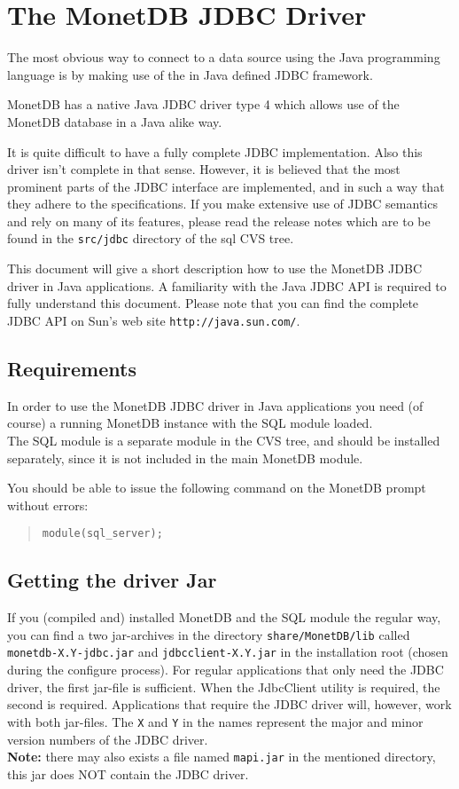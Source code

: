 \documentclass{article}
\begin{document}
\section{The MonetDB JDBC Driver}
The most obvious way to connect to a data source using the Java
programming language is by making use of the in Java defined JDBC
framework.

MonetDB has a native Java JDBC driver type 4 which allows use of the
MonetDB database in a Java alike way.

It is quite difficult to have a fully complete JDBC implementation.
Also this driver isn't complete in that sense.  However, it is believed
that the most prominent parts of the JDBC interface are implemented, and
in such a way that they adhere to the specifications.  If you make
extensive use of JDBC semantics and rely on many of its features, please
read the release notes which are to be found in the \texttt{src/jdbc}
directory of the sql CVS tree.

This document will give a short description how to use the MonetDB JDBC
driver in Java applications.  A familiarity with the Java JDBC API is
required to fully understand this document.  Please note that you can
find the complete JDBC API on Sun's web site \texttt{http://java.sun.com/}.

\subsection{Requirements}
In order to use the MonetDB JDBC driver in Java applications you need
(of course) a running MonetDB instance with the SQL module loaded.\\
The SQL module is a separate module in the CVS tree, and should be
installed separately, since it is not included in the main MonetDB
module.

You should be able to issue the following command on the MonetDB prompt
without errors:
\begin{quote}
\texttt{module(sql\_server);}
\end{quote}

\subsection{Getting the driver Jar}
If you (compiled and) installed MonetDB and the SQL module the regular
way, you can find a two jar-archives in the directory
\texttt{share/MonetDB/lib} called \texttt{monetdb-X.Y-jdbc.jar} and
\texttt{jdbcclient-X.Y.jar} in the installation root (chosen during the
configure process).  For regular applications that only need the JDBC
driver, the first jar-file is sufficient.  When the JdbcClient utility
is required, the second is required.  Applications that require the JDBC
driver will, however, work with both jar-files.  The \texttt{X} and
\texttt{Y} in the names represent the major and minor version numbers of
the JDBC driver.\\
\textbf{Note:} there may also exists a file named \texttt{mapi.jar} in
the mentioned directory, this jar does NOT contain the JDBC driver.
\end{document}
